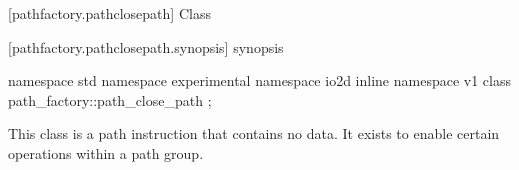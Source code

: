  [pathfactory.pathclosepath] {Class }

%
%
%
 [pathfactory.pathclosepath.synopsis] { synopsis}

\begin{codeblock}
namespace std { namespace experimental { namespace io2d { inline namespace v1 {
  class path_factory::path_close_path {
  };
} } } }
\end{codeblock}

\enternote
This class is a path instruction that contains no data. It exists to enable certain operations within a path group.
\exitnote
